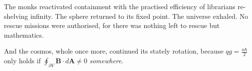 \begin{tcolorbox}[colback=gray!5,colframe=gray!40,boxrule=0.5pt,arc=3pt,boxsep=10pt,left=8pt,right=8pt,top=8pt,bottom=8pt]
\medskip

The monks reactivated containment with the practised efficiency of librarians re-shelving infinity. The sphere returned to its fixed point. The universe exhaled. No rescue missions were authorised, for there was nothing left to rescue but mathematics.

\medskip

And the cosmos, whole once more, continued its stately rotation, because $q g = \frac{n\hbar}{2}$ only holds if $\oint_{\partial V} \mathbf{B} \cdot d\mathbf{A} \ne 0$
\emph{somewhere}.

\end{tcolorbox}


